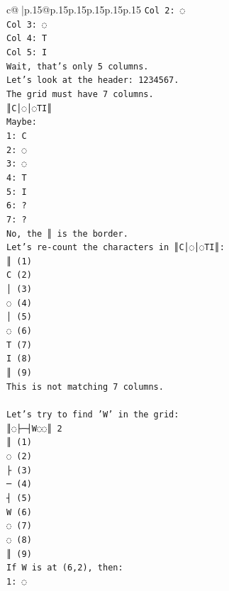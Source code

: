 \documentclass{article}
\begin{document}
{\begin{supertabular}{c@{$\;$}|p{.15\linewidth}@{}p{.15\linewidth}p{.15\linewidth}p{.15\linewidth}p{.15\linewidth}p{.15\linewidth}}
{{{\texttt{Col 2: ◌} \\
\texttt{Col 3: ◌} \\
\texttt{Col 4: T} \\
\texttt{Col 5: I} \\
\texttt{Wait, that's only 5 columns.} \\
\texttt{Let's look at the header: 1234567.} \\
\texttt{The grid must have 7 columns.} \\
\texttt{║C│◌│◌TI║} \\
\texttt{Maybe:} \\
\texttt{1: C} \\
\texttt{2: ◌} \\
\texttt{3: ◌} \\
\texttt{4: T} \\
\texttt{5: I} \\
\texttt{6: ?} \\
\texttt{7: ?} \\
\texttt{No, the ║ is the border.} \\
\texttt{Let's re{-}count the characters in ║C│◌│◌TI║:} \\
\texttt{║ (1)} \\
\texttt{C (2)} \\
\texttt{│ (3)} \\
\texttt{◌ (4)} \\
\texttt{│ (5)} \\
\texttt{◌ (6)} \\
\texttt{T (7)} \\
\texttt{I (8)} \\
\texttt{║ (9)} \\
\texttt{This is not matching 7 columns.} \\
\\ 
\texttt{Let's try to find 'W' in the grid:} \\
\texttt{║◌├─┤W◌◌║ 2} \\
\texttt{║ (1)} \\
\texttt{◌ (2)} \\
\texttt{├ (3)} \\
\texttt{─ (4)} \\
\texttt{┤ (5)} \\
\texttt{W (6)} \\
\texttt{◌ (7)} \\
\texttt{◌ (8)} \\
\texttt{║ (9)} \\
\texttt{If W is at (6,2), then:} \\
\texttt{1: ◌} \\
}}}
\end{supertabular}}
\end{document}
